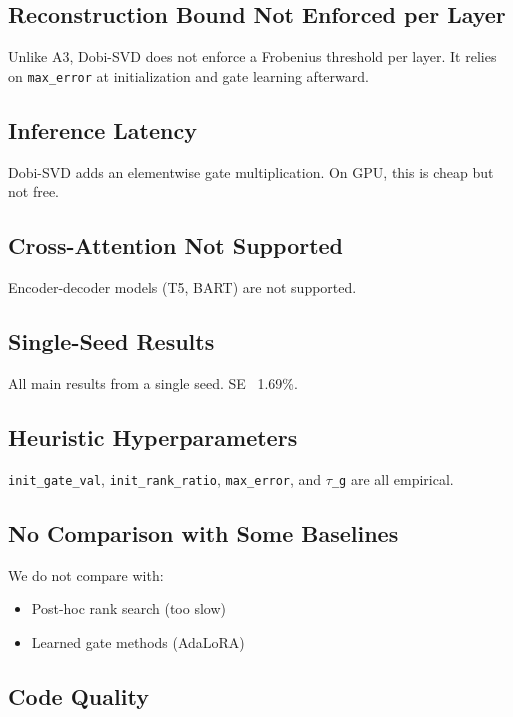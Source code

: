 \subsection{Reconstruction Bound Not Enforced per Layer}

Unlike A3, Dobi-SVD does not enforce a Frobenius threshold per layer. It 
relies on \texttt{max\_error} at initialization and gate learning afterward.

\subsection{Inference Latency}

Dobi-SVD adds an elementwise gate multiplication. On GPU, this is cheap 
but not free.

\subsection{Cross-Attention Not Supported}

Encoder-decoder models (T5, BART) are not supported.

\subsection{Single-Seed Results}

All main results from a single seed. SE ~1.69\%.

\subsection{Heuristic Hyperparameters}

\texttt{init\_gate\_val}, \texttt{init\_rank\_ratio}, \texttt{max\_error}, and \texttt{$\tau$\_g} are all empirical.

\subsection{No Comparison with Some Baselines}

We do not compare with:
\begin{itemize}
\item Post-hoc rank search (too slow)
\item Learned gate methods (AdaLoRA)

\end{itemize}
\subsection{Code Quality}

